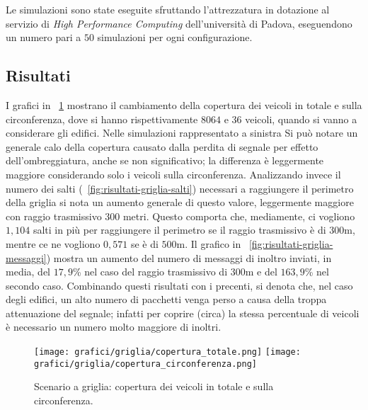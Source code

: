 Le simulazioni sono state eseguite sfruttando l'attrezzatura in dotazione al servizio di \textit{High Performance Computing} dell'università di Padova,
eseguendono un numero pari a $50$ simulazioni per ogni configurazione.
%
%
\subsection{Risultati}\label{sec:configurazione-griglia-risultati}
I grafici in \figurename~\ref{fig:risultati-griglia-copertura} mostrano il cambiamento della copertura dei veicoli in totale e sulla circonferenza,
dove si hanno rispettivamente $8064$ e $36$ veicoli, quando si vanno a considerare gli edifici.
Nelle simulazioni rappresentato a sinistra
Si può notare un generale calo della copertura causato dalla perdita di segnale per effetto dell'ombreggiatura,
anche se non significativo; la differenza è leggermente maggiore considerando solo i veicoli sulla circonferenza.
Analizzando invece il numero dei salti (\figurename~\ref{fig:risultati-griglia-salti}) necessari a raggiungere il perimetro della griglia
si nota un aumento generale di questo valore, leggermente maggiore con raggio trasmissivo $300$ metri.
Questo comporta che, mediamente, ci vogliono $1,104$ salti in più per raggiungere il perimetro se il raggio
trasmissivo è di $300$m, mentre ce ne vogliono $0,571$ se è di $500$m.
Il grafico in \figurename~\ref{fig:risultati-griglia-messaggi}) mostra un aumento del numero di messaggi
di inoltro inviati, in media, del $17,9$\% nel caso del raggio trasmissivo di $300$m
e del $163,9$\% nel secondo caso.
Combinando questi risultati con i precenti, si denota che, nel caso degli edifici,
un alto numero di pacchetti venga perso a causa della troppa attenuazione del segnale;
infatti per coprire (circa) la stessa percentuale di veicoli è necessario un numero molto maggiore di inoltri.
%
\begin{figure}[htbp]
	\centering
		\texttt{[image: grafici/griglia/copertura\_totale.png]}
		\texttt{[image: grafici/griglia/copertura\_circonferenza.png]}
\caption{Scenario a griglia: copertura dei veicoli in totale e sulla circonferenza.\label{fig:risultati-griglia-copertura}}
\end{figure}
